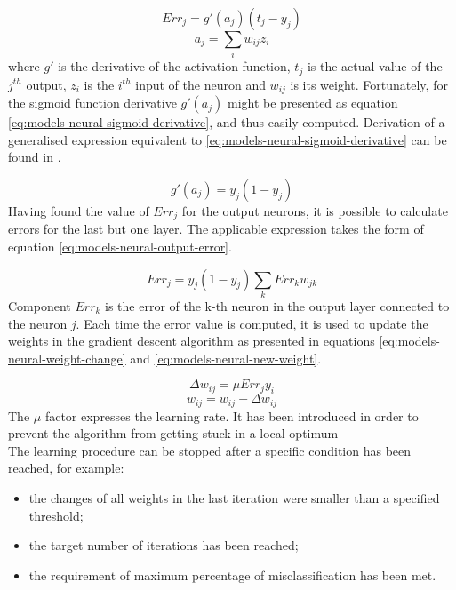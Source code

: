 \begin{equation}\label{eq:models-neural-error}
Err_j = g'(a_j) (t_j - y_j)
\end{equation}
\begin{equation}\label{eq:models-neural-neuron-output}
a_j=\sum_{i} w_{ij} z_i
\end{equation}
where $g'$ is the derivative of the activation function, $t_j$ is the actual value of the $j^{th}$ output, $z_i$ is the $i^{th}$ input of the neuron and $w_{ij}$ is its weight. Fortunately, for the sigmoid function derivative $g'(a_j)$ might be presented as equation \ref{eq:models-neural-sigmoid-derivative}, and thus easily computed. Derivation of a generalised expression equivalent to \ref{eq:models-neural-sigmoid-derivative} can be found in \cite{BISHOP1995}.

\begin{equation} \label{eq:models-neural-sigmoid-derivative}
g'(a_j) = y_j (1 - y_j)
\end{equation}
Having found the value of $Err_j$ for the output neurons, it is possible to calculate errors for the last but one layer. The applicable expression takes the form of equation \ref{eq:models-neural-output-error}.

\begin{equation}\label{eq:models-neural-output-error}
Err_j = y_j(1-y_j) \sum_{k} Err_k w_{jk}
\end{equation}
Component $Err_k$ is the error of the k-th neuron in the output layer connected to the neuron $j$. Each time the error value is computed, it is used to update the weights in the gradient descent algorithm as presented in equations \ref{eq:models-neural-weight-change} and \ref{eq:models-neural-new-weight}.

\begin{equation}\label{eq:models-neural-weight-change}
\Delta w_{ij} = \mu Err_j y_i
\end{equation}
\begin{equation}\label{eq:models-neural-new-weight}
w_{ij} = w_{ij} - \Delta w_{ij}
\end{equation}
The $\mu$ factor expresses the learning rate. It has been introduced in order to prevent the algorithm from getting stuck in a local optimum
\\
The learning procedure can be stopped after a specific condition has been reached, for example:
\begin{itemize}
	\item the changes of all weights in the last iteration were smaller than a specified threshold; 
	\item the target number of iterations has been reached;
	\item the requirement of maximum percentage of misclassification has been met.
\end{itemize}

